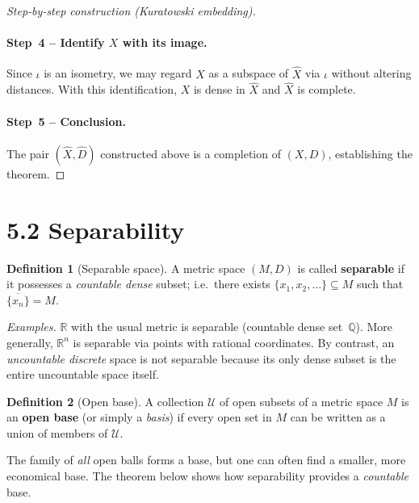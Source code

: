 \documentclass[12pt]{article}
\theoremstyle{definition} %
\newtheorem{definition}{Definition}
\theoremstyle{plain} %
\begin{document}
\begin{proof}[Step‑by‑step construction (Kuratowski embedding)]
  \paragraph{\textbf{Step 4 – Identify $X$ with its image.}}
  Since $\iota$ is an isometry, we may regard $X$ as a
  subspace of $\widehat{X}$ via $\iota$ without altering distances.
  With this identification, $X$ is dense in $\widehat{X}$ and
  $\widehat{X}$ is complete.

  \paragraph{\textbf{Step 5 – Conclusion.}}
  The pair $(\widehat{X},\widehat{D})$ constructed above is a
  completion of $(X,D)$, establishing the theorem.
\end{proof}

\section*{5.2 \quad Separability}

\begin{definition}[Separable space]
    A metric space $(M,D)$ is called \textbf{separable} if it
    possesses a \emph{countable dense} subset;
    i.e.\ there exists $\{x_1,x_2,\dots\}\subseteq M$ such that
    $\overline{\{x_n\}}=M$.
\end{definition}

\medskip
\noindent
{\small
\emph{Examples.}  $\mathbb R$ with the usual metric is separable
(countable dense set $\mathbb Q$).  
More generally, $\mathbb R^{n}$ is separable via points with rational
coordinates.  
By contrast, an \emph{uncountable discrete} space is not separable
because its only dense subset is the entire uncountable space itself.
}

\bigskip
\begin{definition}[Open base]
    A collection $\mathcal U$ of open subsets of a metric space $M$
    is an \textbf{open base} (or simply a \emph{basis})
    if every open set in $M$ can be written as a union of members of
    $\mathcal U$.
\end{definition}

\medskip
\noindent
The family of \emph{all} open balls forms a base, but one can often find
a smaller, more economical base.  
The theorem below shows how separability provides a \emph{countable} base.
\end{document}
